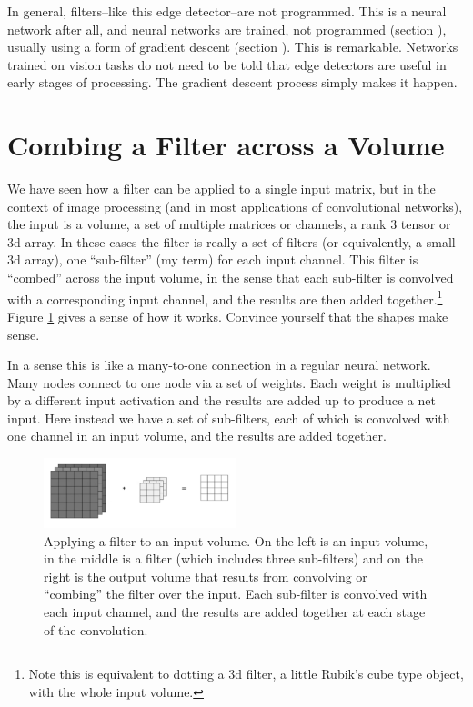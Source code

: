 In general, filters--like this edge detector--are not programmed. This is a neural network after all, and neural networks are trained, not programmed (section ), usually using a form of gradient descent (section ). This is remarkable. Networks trained on vision tasks do not need to be told that edge detectors are useful in early stages of processing. The gradient descent process simply makes it happen.

\section{Combing a Filter across a Volume}

We have seen how a filter can be applied to a single input matrix, but in the context of image processing (and in most applications of convolutional networks), the input is a volume, a set of multiple matrices or channels, a rank 3 tensor or 3d array.  In these cases the filter is really a set of filters (or equivalently, a small 3d array), one ``sub-filter'' (my term) for each input channel.  This filter is ``combed'' across the input volume, in the sense that each sub-filter is convolved with a corresponding input channel, and the results are then added together.\footnote{Note this is equivalent to dotting a 3d filter, a little Rubik's cube type object, with the whole input volume.}  Figure \ref{combing} gives a sense of how it works. Convince yourself that the shapes make sense.

In a sense this is like a many-to-one connection in a regular neural network. Many nodes connect to one node via a set of weights.  Each weight is multiplied by a different input activation and the results are added up to produce a net input.  Here instead we have a set of sub-filters, each of which is convolved with one channel in an input volume, and the results are added together.

\begin{figure}
\centering
\includegraphics[width=0.5\textwidth]{images/filterComb.png}
\caption[Todo.]{Applying a filter to an input volume. On the left is an input volume, in the middle is a filter (which includes three sub-filters) and on the right is the output volume that results from convolving or ``combing'' the filter over the input. Each sub-filter is convolved with each input channel, and the results are added together at each stage of the convolution. }
\label{combing}
\end{figure}

